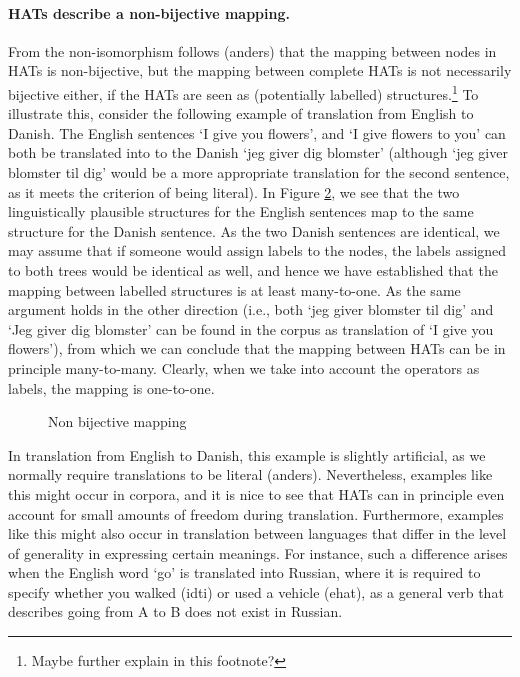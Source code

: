 \documentclass{report}
\newcommand\textcyr[1]{{\fontencoding{OT2}\fontfamily{wncyr}\selectfont #1}}
\theoremstyle{definition}
\theoremstyle{plain}
\begin{document}
\begin{figure}
\caption{}\label{fig:nepas}
\end{figure}

\paragraph{HATs describe a non-bijective mapping.} From the non-isomorphism follows (anders) that the mapping between nodes in HATs is non-bijective, but the mapping between complete HATs is not necessarily bijective either, if the HATs are seen as (potentially labelled) structures.\footnote{Maybe further explain in this footnote?} To illustrate this, consider the following example of translation from English to Danish. The English sentences `I give you flowers', and `I give flowers to you' can both be translated into to the Danish `jeg giver dig blomster' (although `jeg giver blomster til dig' would be a more appropriate translation for the second sentence, as it meets the criterion of being literal). In Figure \ref{fig:nonbij}, we see that the two linguistically plausible structures for the English sentences map to the same structure for the Danish sentence. As the two Danish sentences are identical, we may assume that if someone would assign labels to the nodes, the labels assigned to both trees would be identical as well, and hence we have established that the mapping between labelled structures is at least many-to-one. As the same argument holds in the other direction (i.e., both `jeg giver blomster til dig' and `Jeg giver dig blomster' can be found in the corpus as translation of `I give you flowers'), from which we can conclude that the mapping between HATs can be in principle many-to-many. Clearly, when we take into account the operators as labels, the mapping is one-to-one. 

\begin{figure}
\caption{Non bijective mapping}\label{fig:nonbij}
\end{figure}

In translation from English to Danish, this example is slightly artificial, as we normally require translations to be literal (anders). Nevertheless, examples like this might occur in corpora, and it is nice to see that HATs can in principle even account for small amounts of freedom during translation. Furthermore, examples like this might also occur in translation between languages that differ in the level of generality in expressing certain meanings. For instance, such a difference arises when the English word `go' is translated into Russian, where it is required to specify whether you walked (\textcyr{idti}) or used a vehicle (\textcyr{ehat}), as a general verb that describes going from A to B does not exist in Russian.
\end{document}
